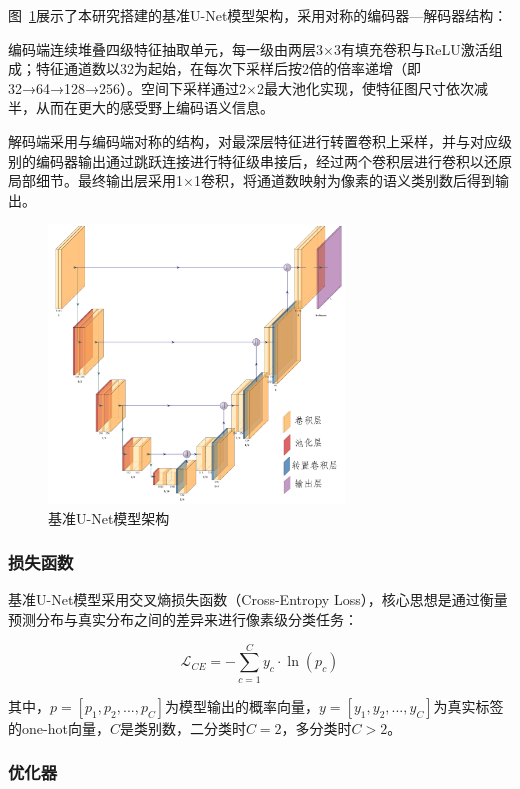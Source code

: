 图~\ref{fig:unet_ushape}展示了本研究搭建的基准U-Net模型架构，采用对称的编码器—解码器结构：

编码端连续堆叠四级特征抽取单元，每一级由两层3×3有填充卷积与ReLU激活组成；特征通道数以32为起始，在每次下采样后按2倍的倍率递增（即32→64→128→256）。空间下采样通过2×2最大池化实现，使特征图尺寸依次减半，从而在更大的感受野上编码语义信息。

解码端采用与编码端对称的结构，对最深层特征进行转置卷积上采样，并与对应级别的编码器输出通过跳跃连接进行特征级串接后，经过两个卷积层进行卷积以还原局部细节。最终输出层采用1×1卷积，将通道数映射为像素的语义类别数后得到输出。

\begin{figure}[h]
    \centering
    \includegraphics[width=0.7\textwidth]{fig/Unet_ushape.png}
    \caption{基准U-Net模型架构}
    \label{fig:unet_ushape}
\end{figure}

\subsubsection{损失函数}

基准U-Net模型采用交叉熵损失函数（Cross-Entropy Loss），核心思想是通过衡量预测分布与真实分布之间的差异来进行像素级分类任务：

\begin{equation}
    \mathcal{L}_{CE} = -\sum_{c=1}^{C} y_c \cdot \ln (p_c)
\end{equation}

其中，$p=[p_1,p_2,...,p_C]$为模型输出的概率向量，$y=[y_1,y_2,...,y_C]$为真实标签的one-hot向量，$C$是类别数，二分类时$C=2$，多分类时$C>2$。

\subsubsection{优化器}

